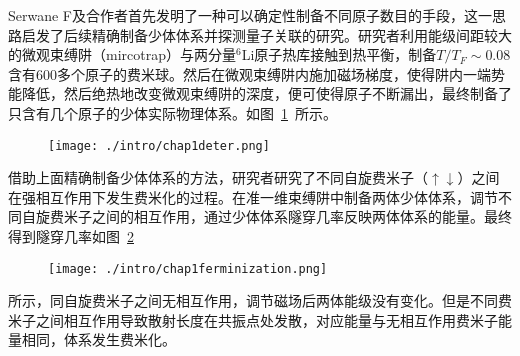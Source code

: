 Serwane F及合作者首先发明了一种可以确定性制备不同原子数目的手段\cite{SerwaneDeterministic}，这一思路启发了后续精确制备少体体系并探测量子关联的研究\cite{zurn2012fermionization,WenzFermiSeaOnebyOne,Zurn2013Pairing,MurmannSpinChain,MurmannTwoFermionDoubleWell,RontaniTunneling}。研究者利用能级间距较大的微观束缚阱（mircotrap）与两分量${}^6$Li原子热库接触到热平衡，制备$T/T_F\sim0.08$含有600多个原子的费米球。然后在微观束缚阱内施加磁场梯度，使得阱内一端势能降低，然后绝热地改变微观束缚阱的深度，便可使得原子不断漏出，最终制备了只含有几个原子的少体实际物理体系。如图~\ref{deter}~所示。
\begin{figure}[!htbp]
    \centering
    \texttt{[image: ./intro/chap1deter.png]}
    \label{deter}
\end{figure}

借助上面精确制备少体体系的方法，研究者研究了不同自旋费米子（$\uparrow\downarrow$）之间在强相互作用下发生费米化的过程\cite{zurn2012fermionization}。在准一维束缚阱中制备两体少体体系，调节不同自旋费米子之间的相互作用，通过少体体系隧穿几率反映两体体系的能量。最终得到隧穿几率如图~\ref{ferminization}~
\begin{figure}[!htbp]
    \centering
    \texttt{[image: ./intro/chap1ferminization.png]}
    \label{ferminization}
\end{figure}
所示，同自旋费米子之间无相互作用，调节磁场后两体能级没有变化。但是不同费米子之间相互作用导致散射长度在共振点处发散，对应能量与无相互作用费米子能量相同，体系发生费米化。


